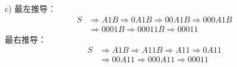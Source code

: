 \begin{solution}
    c) 最左推导：
    \begin{align*}
        S   &\Rightarrow A1B \Rightarrow 0A1B \Rightarrow 00A1B \Rightarrow 000A1B \\
        &\Rightarrow 0001B \Rightarrow 00011B \Rightarrow 00011
    \end{align*}
    最右推导：
    \begin{align*}
        S   &\Rightarrow A1B \Rightarrow A11B \Rightarrow A11 \Rightarrow 0A11 \\
        &\Rightarrow 00A11 \Rightarrow 000A11 \Rightarrow 00011
    \end{align*}
\end{solution}